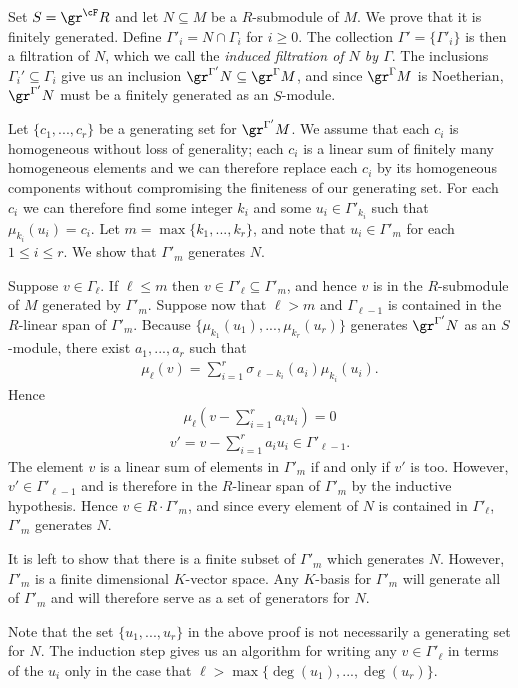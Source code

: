 \begin{prf}
	Set $S = \gr^\cF R$ and let $N \subseteq M$ be a $R$-submodule of $M$. We prove that it is finitely generated. Define $\Gamma'_i = N \cap \Gamma_i$ for $i \geq 0$. The collection $\Gamma' = \{\Gamma'_i\}$ is then a filtration of $N$, which we call the \emph{induced filtration of $N$ by $\Gamma$}. The inclusions $\Gamma_i' \subseteq \Gamma_i$ give us an inclusion $\gr^{\Gamma'} N \subseteq \gr^\Gamma M$, and since $\gr^\Gamma M$ is Noetherian, $\gr^{\Gamma'}N$ must be a finitely generated as an $S$-module.

	Let $\{c_1,...,c_r\}$ be a generating set for $\gr^{\Gamma'}M$. We assume that each $c_i$ is homogeneous without loss of generality; each $c_i$ is a linear sum of finitely many homogeneous elements and we can therefore replace each $c_i$ by its homogeneous components without compromising the finiteness of our generating set. For each $c_i$ we can therefore find some integer $k_i$ and some $u_i \in \Gamma'_{k_i}$ such that $\mu_{k_i}(u_i) = c_i$. Let $m = \max\{k_1,...,k_r\}$, and note that $u_i \in \Gamma'_m$ for each $1\leq i\leq r$. We show that $\Gamma'_m$ generates $N$.

    Suppose $v \in \Gamma_\ell$. If $\ell \leq m$ then $v \in \Gamma'_\ell \subseteq \Gamma'_m$, and hence $v$ is in the $R$-submodule of $M$ generated by $\Gamma'_m$. Suppose now that $\ell > m$ and $\Gamma_{\ell - 1}$ is contained in the $R$-linear span of $\Gamma'_m$. Because $\{\mu_{k_1}(u_1),...,\mu_{k_r}(u_r)\}$ generates $\gr^{\Gamma'}N$ as an $S$-module, there exist $a_1,...,a_r$ such that
	\begin{align*}
		\mu_\ell(v) = \sum_{i=1}^r \sigma_{\ell-k_i}(a_i)\mu_{k_i}(u_i).
	\end{align*}
	Hence
	\begin{align*}
		\mu_\ell \left(v - \sum_{i=1}^r a_i u_i\right) = 0
	\end{align*}
	\begin{align*}
		v' = v - \sum_{i=1}^r a_i u_i \in \Gamma'_{\ell - 1}.
	\end{align*}
	The element $v$ is a linear sum of elements in $\Gamma'_m$ if and only if $v'$ is too. However, $v' \in \Gamma'_{\ell - 1}$ and is therefore in the $R$-linear span of $\Gamma'_{m}$ by the inductive hypothesis. Hence $v \in R\cdot \Gamma'_m$, and since every element of $N$ is contained in $\Gamma'_\ell$, $\Gamma'_m$ generates $N$.

	It is left to show that there is a finite subset of $\Gamma'_m$ which generates $N$. However, $\Gamma'_m$ is a finite dimensional $K$-vector space. Any $K$-basis for $\Gamma'_m$ will generate all of $\Gamma'_m$ and will therefore serve as a set of generators for $N$.
\end{prf}
Note that the set $\{u_1,...,u_r\}$ in the above proof is not necessarily a generating set for $N$. The induction step gives us an algorithm for writing any $v \in \Gamma'_\ell$ in terms of the $u_i$ only in the case that $\ell > \max\{\deg(u_1),...,\deg(u_r)\}$.

